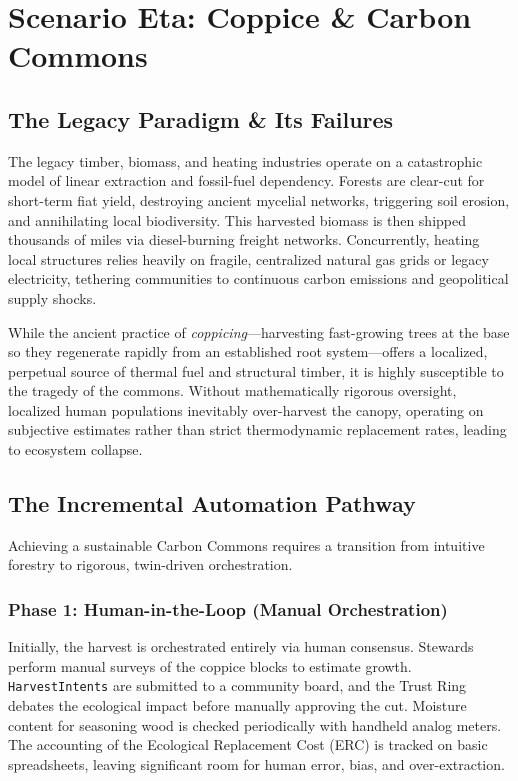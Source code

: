 \chapter{Scenario Eta: Coppice \& Carbon Commons}
\label{ch:eta}

\section{The Legacy Paradigm \& Its Failures}
The legacy timber, biomass, and heating industries operate on a catastrophic model of linear extraction and fossil-fuel dependency. Forests are clear-cut for short-term fiat yield, destroying ancient mycelial networks, triggering soil erosion, and annihilating local biodiversity. This harvested biomass is then shipped thousands of miles via diesel-burning freight networks. Concurrently, heating local structures relies heavily on fragile, centralized natural gas grids or legacy electricity, tethering communities to continuous carbon emissions and geopolitical supply shocks.

While the ancient practice of \textit{coppicing}---harvesting fast-growing trees at the base so they regenerate rapidly from an established root system---offers a localized, perpetual source of thermal fuel and structural timber, it is highly susceptible to the tragedy of the commons. Without mathematically rigorous oversight, localized human populations inevitably over-harvest the canopy, operating on subjective estimates rather than strict thermodynamic replacement rates, leading to ecosystem collapse.

\section{The Incremental Automation Pathway}
Achieving a sustainable Carbon Commons requires a transition from intuitive forestry to rigorous, twin-driven orchestration.

\subsection{Phase 1: Human-in-the-Loop (Manual Orchestration)}
Initially, the harvest is orchestrated entirely via human consensus. Stewards perform manual surveys of the coppice blocks to estimate growth. \texttt{HarvestIntents} are submitted to a community board, and the Trust Ring debates the ecological impact before manually approving the cut. Moisture content for seasoning wood is checked periodically with handheld analog meters. The accounting of the Ecological Replacement Cost (ERC) is tracked on basic spreadsheets, leaving significant room for human error, bias, and over-extraction.

